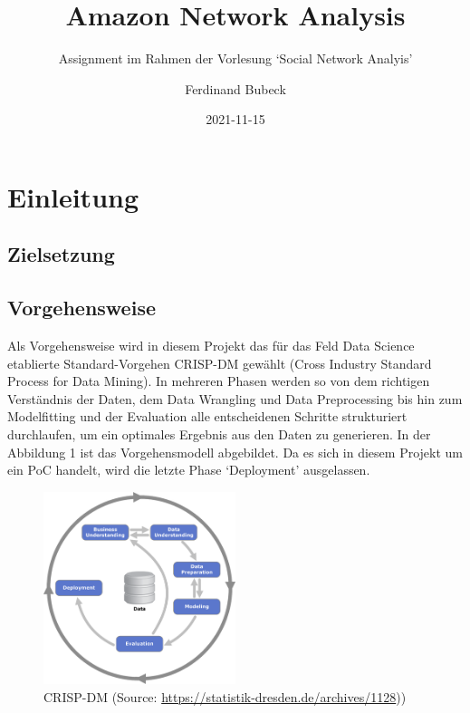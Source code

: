 \documentclass[
  12 pt,
]{article}
\title{Amazon Network Analysis}
\subtitle{Assignment im Rahmen der Vorlesung `Social Network Analyis'}
\author{Ferdinand Bubeck}
\date{2021-11-15}
\begin{document}
\maketitle

\renewcommand*\contentsname{Inhaltsverzeichnis}
{
\setcounter{tocdepth}{2}
\tableofcontents
}
\newpage

\hypertarget{einleitung}{%
\section{Einleitung}\label{einleitung}}

\hypertarget{zielsetzung}{%
\subsection{Zielsetzung}\label{zielsetzung}}

\hypertarget{vorgehensweise}{%
\subsection{Vorgehensweise}\label{vorgehensweise}}

Als Vorgehensweise wird in diesem Projekt das für das Feld Data Science
etablierte Standard-Vorgehen CRISP-DM gewählt (Cross Industry Standard
Process for Data Mining). In mehreren Phasen werden so von dem richtigen
Verständnis der Daten, dem Data Wrangling und Data Preprocessing bis hin
zum Modelfitting und der Evaluation alle entscheidenen Schritte
strukturiert durchlaufen, um ein optimales Ergebnis aus den Daten zu
generieren. In der Abbildung 1 ist das Vorgehensmodell abgebildet. Da es
sich in diesem Projekt um ein PoC handelt, wird die letzte Phase
`Deployment' ausgelassen.

\begin{figure}
\centering
\includegraphics[width=0.5\textwidth,height=\textheight]{Data/CRISP-DM_Process_Diagram1.png}
\caption{CRISP-DM (Source:
\url{https://statistik-dresden.de/archives/1128}))}
\end{figure}
\end{document}
